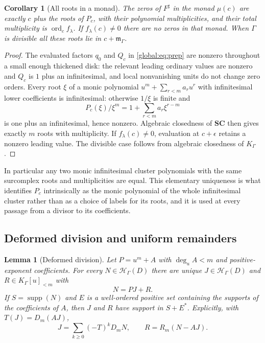 \documentclass[11pt,letterpaper]{article}
\newtheorem{lemma}[lemma]{Lemma}
\newtheorem{corollary}[corollary]{Corollary}
\theoremstyle{definition}
\theoremstyle{remark}
\newcommand{\SC}{\mathbf{SC}}
\newcommand{\HH}{\mathscr H_\Gamma}
\newcommand{\KK}{K_\Gamma}
\newcommand{\mK}{\mathfrak m_\Gamma}
\newcommand{\sh}{^{\sharp}}
\newcommand{\supp}{\operatorname{supp}}
\newcommand{\ord}{\operatorname{ord}}
\numberwithin{equation}{section}
\begin{document}
\begin{corollary}[All roots in a monad]\label{global:cor:roots}
The zeros of $F\sh$ in the monad $\mu(c)$ are exactly $c$ plus the roots of $P_c$, with their polynomial multiplicities, and their total multiplicity is $\ord_cf_\lambda$. If $f_\lambda(c)\ne0$ there are no zeros in that monad. When $\Gamma$ is divisible all these roots lie in $c+\mK$.
\end{corollary}

\begin{proof}
The evaluated factors $q_0$ and $Q_c$ in \eqref{global:eq:prep} are nonzero throughout a small enough thickened disk: the relevant leading ordinary values are nonzero and $Q_c$ is $1$ plus an infinitesimal, and local nonvanishing units do not change zero orders. Every root $\xi$ of a monic polynomial $u^m+\sum_{r<m}a_ru^r$ with infinitesimal lower coefficients is infinitesimal: otherwise $1/\xi$ is finite and
\[
  P_c(\xi)/\xi^m=1+\sum_{r<m}a_r\xi^{r-m}
\]
is one plus an infinitesimal, hence nonzero. Algebraic closedness of $\SC$ then gives exactly $m$ roots with multiplicity. If $f_\lambda(c)\ne0$, evaluation at $c+\epsilon$ retains a nonzero leading value. The divisible case follows from algebraic closedness of $\KK$ \cite[Corollary~4]{Poonen}.
\end{proof}

In particular any two monic infinitesimal cluster polynomials with the same surcomplex roots and multiplicities are equal. This elementary uniqueness is what identifies $P_c$ intrinsically as the monic polynomial of the whole infinitesimal cluster rather than as a choice of labels for its roots, and it is used at every passage from a divisor to its coefficients.

\subsection{Deformed division and uniform remainders}

\begin{lemma}[Deformed division]\label{global:lem:division}
Let $P=u^m+A$ with $\deg_uA<m$ and positive-exponent coefficients. For every $N\in\HH(D)$ there are unique $J\in\HH(D)$ and $R\in\KK[u]_{<m}$ with
\begin{equation}\label{global:eq:deformeddivision}
  N=PJ+R .
\end{equation}
If $S=\supp(N)$ and $E$ is a well-ordered positive set containing the supports of the coefficients of $A$, then $J$ and $R$ have support in $S+E^*$. Explicitly, with $T(J)=D_m(AJ)$,
\begin{equation}\label{global:eq:divisioninverse}
  J=\sum_{k\ge0}(-T)^kD_mN,
  \qquad R=R_m(N-AJ).
\end{equation}
\end{lemma}
\end{document}
